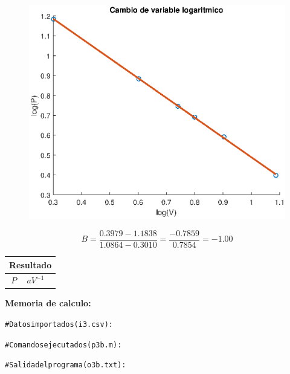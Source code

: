 \documentclass[letter,11pt]{article}
\begin{document}
\begin{enumerate}
    \begin{figure}[!h]
    \centering
    \includegraphics[scale=0.75]{resources/g3b.eps}
    \end{figure}

    \begin{equation*}
        B = \frac{0.3979-1.1838}{1.0864-0.3010} = \frac{-0.7859}{0.7854} = -1.00
    \end{equation*}

    \begin{center}
    \begin{tabular}{|c|>{\centering}m{5.0cm}<{\centering}|}
    \hline
    \multicolumn{2}{|c|}{\textbf{Resultado}}
    \tabularnewline \hline
    $P$ & $a V^{-1}$ \tabularnewline \hline
    \end{tabular}
    \end{center}

    \vspace{1.0cm}
    \textbf{Memoria de calculo:}
    \begin{shaded}
        \begin{alltt}
            \footnotesize
\# Datos importados (i3.csv):


\# Comandos ejecutados (p3b.m):


\# Salida del programa (o3b.txt):

            \normalsize
        \end{alltt}
    \end{shaded}


\end{enumerate}
\end{document}

